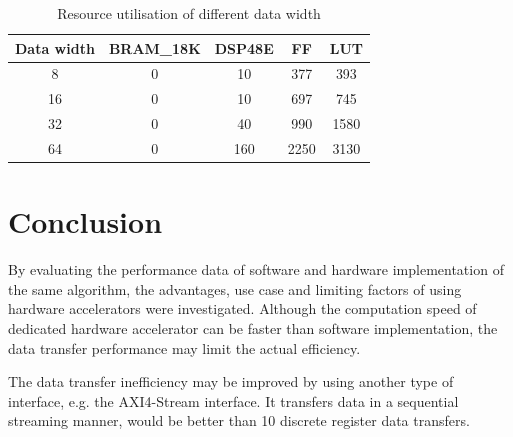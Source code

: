 \documentclass[journal]{IEEEtran}
\begin{document}
\begin{table}[!ht]
	\renewcommand{\arraystretch}{1.3}
	\caption{Resource utilisation of different data width}
	\label{tbl:reswidth}
	\centering
	\begin{tabular}{ccccc}
		\hline
		Data width	& BRAM\_18K	& DSP48E	& FF	& LUT	\\
		\hline
		8	& 0	& 10	& 377	& 393	\\
		16	& 0	& 10	& 697	& 745	\\
		32	& 0	& 40	& 990	& 1580	\\
		64	& 0	& 160	& 2250	& 3130	\\
		\hline
	\end{tabular}
\end{table}

\fi

\section{Conclusion}

By evaluating the performance data of software and hardware implementation of the same algorithm, the advantages, use case and limiting factors of using hardware accelerators were investigated. Although the computation speed of dedicated hardware accelerator can be faster than software implementation, the data transfer performance may limit the actual efficiency.

The data transfer inefficiency may be improved by using another type of interface, e.g. the AXI4-Stream interface. It transfers data in a sequential streaming manner, would be better than 10 discrete register data transfers.




\end{document}

